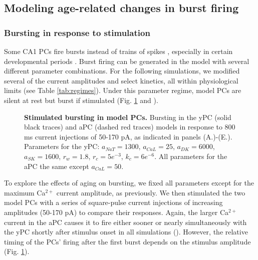 \documentclass[10pt,letterpaper]{article}
\newcommand{\Ca}{Ca$^{2+}$}
\begin{document}
\subsection*{Modeling age-related changes in burst firing}

\smallskip

\subsubsection*{Bursting in response to stimulation}

Some CA1 PCs fire bursts instead of trains of spikes \cite{su2001extracellular}, especially in certain developmental periods \cite{chen2005transitional}. Burst firing can be generated in the model with several different parameter combinations. For the following simulations, we modified several of the current amplitudes and select kinetics, all within physiological limits (see Table \ref{tab:regimes}). Under this parameter regime, model PCs are silent at rest but burst if stimulated (Fig. \ref{fig:burstStims} and ).

\begin{figure}[h!]
\centering
\caption{{\bf Stimulated bursting in model PCs.}
Bursting in the yPC (solid black traces) and aPC (dashed red traces) models in response to 800 ms current injections of 50-170 pA, as indicated in panels (A.)-(E.). Parameters for the yPC: $a_{NaT}= 1300$, $a_{CaL}=25$, $a_{DK}=6000$, $a_{SK}=1600$, $r_{w}=1.8$, $r_{c}=5e^{-3}$, $k_{c}=6e^{-6}$. All parameters for the aPC the same except $a_{CaL}=50$.}
\label{fig:burstStims}
\end{figure}

To explore the effects of aging on bursting, we fixed all parameters except for the maximum {\Ca} current amplitude, as previously. We then stimulated the two model PCs with a series of square-pulse current injections of increasing amplitudes (50-170 pA) to compare their responses. Again, the larger {\Ca} current in the aPC causes it to fire either sooner or nearly simultaneously with the yPC shortly after stimulus onset in all simulations (). However, the relative timing of the PCs' firing after the first burst depends on the stimulus amplitude (Fig. \ref{fig:burstStims}).
\end{document}
